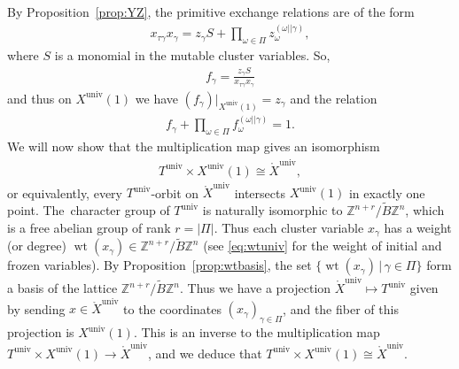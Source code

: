 \documentclass[10pt,a4paper]{amsart}
\def\Z{{\mathbb Z}}
\def\Xo{{\mathring{X}}}
\def\univ{{\operatorname{univ}}}
\def\tB{{\tilde B}}
\def\wt{\operatorname{wt}}
\def\tB{{\tilde B}}
\numberwithin{equation}{section}
\begin{document}
By Proposition~\ref{prop:YZ}, the primitive exchange relations are of the form
\begin{gather*}
x_{\tau \gamma} x_\gamma = z_\gamma S + \prod_{\omega \in \Pi } z_{\omega}^{(\omega||\gamma)},
\end{gather*}
where $S$ is a monomial in the mutable cluster variables. So,
\begin{gather*}
f_\gamma = \frac{z_\gamma S}{x_{\tau\gamma} x_\gamma }
\end{gather*}
and thus on $X^\univ(1)$ we have $(f_\gamma)|_{X^\univ(1)} = z_\gamma$ and the relation
\begin{gather}\label{eq:f}
f_\gamma + \prod_{\omega \in \Pi } f_{\omega}^{(\omega||\gamma)} = 1.
\end{gather}
We will now show that the multiplication map gives an isomorphism
\begin{gather*}%
T^\univ \times X^\univ(1) \cong \Xo^\univ,
\end{gather*}
or equivalently, every $T^\univ$-orbit on $\Xo^\univ$ intersects $X^\univ(1)$ in exactly one point. The~character group of $T^\univ$ is naturally isomorphic to $\Z^{n+r}/\tB \Z^n$, which is a free abelian group of rank $r = |\Pi|$. Thus each cluster variable $x_\gamma$ has a weight (or degree) $\wt(x_\gamma) \in \Z^{n+r}/\tB \Z^n$ (see \eqref{eq:wtuniv} for the weight of initial and frozen variables). By Proposition~\ref{prop:wtbasis}, %
the set $\{\wt(x_\gamma) \,|\, \gamma \in \Pi\}$ form a basis of the lattice $\Z^{n+r}/\tB \Z^n$. Thus we have a projection $\Xo^\univ \mapsto T^\univ$ given by sending $x \in \Xo^\univ$ to the coordinates $(x_\gamma)_{\gamma \in \Pi}$, and the fiber of this projection is $X^\univ(1)$. This is an inverse to the multiplication map $T^\univ \times X^\univ(1) \to \Xo^\univ$, and we deduce that $T^\univ \times X^\univ(1) \cong \Xo^\univ$.
\end{document}
